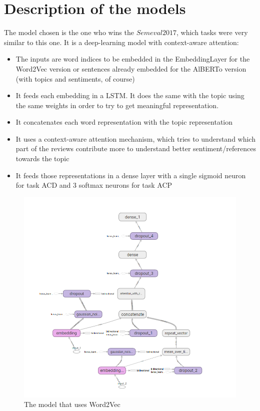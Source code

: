 \documentclass{article}
\begin{document}
    \section{Description of the models}\label{sec:s3}
        The model chosen is the one who wins the $Semeval2017$, which tasks were very similar to this one.
        It is a deep-learning model with context-aware attention:
        \begin{itemize}
            \item The inputs are word indices to be embedded in the EmbeddingLayer for the Word2Vec version or sentences already embedded for the AlBERTo version (with topics and sentiments, of course)
            \item It feeds each embedding in a LSTM. It does the same with the topic using the same weights in order to try to get meaningful representation.
            \item It concatenates each word representation with the topic representation
            \item It uses a context-aware attention mechanism, which tries to understand which part of the reviews contribute more to understand better sentiment/references towards the topic
            \item It feeds those representations in a dense layer with a single sigmoid neuron for task ACD and 3 softmax neurons for task ACP
        \end{itemize}
        \begin{figure}
            \includegraphics[width=\linewidth]{w2v_model.png}
            \caption{The model that uses Word2Vec}
            \label{fig:w2v_model}
        \end{figure}
\end{document}
